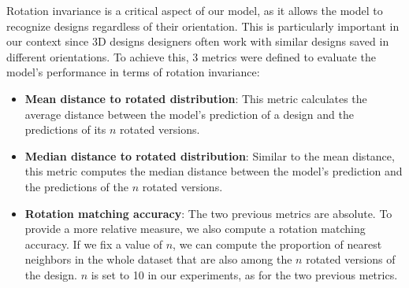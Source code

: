 Rotation invariance is a critical aspect of our model, as it allows the model to recognize designs regardless of their orientation. This is particularly important in our context since 3D designs designers often work with similar designs saved in different orientations. To achieve this, 3 metrics were defined to evaluate the model's performance in terms of rotation invariance:
\begin{itemize}
    \item \textbf{Mean distance to rotated distribution}: This metric calculates the average distance between the model's prediction of a design and the predictions of its $n$ rotated versions. 
    \item \textbf{Median distance to rotated distribution}: Similar to the mean distance, this metric computes the median distance between the model's prediction and the predictions of the $n$ rotated versions.
    \item \textbf{Rotation matching accuracy}: The two previous metrics are absolute. To provide a more relative measure, we also compute a rotation matching accuracy. If we fix a value of $n$, we can compute the proportion of nearest neighbors in the whole dataset that are also among the $n$ rotated versions of the design. $n$ is set to 10 in our experiments, as for the two previous metrics.
\end{itemize}

